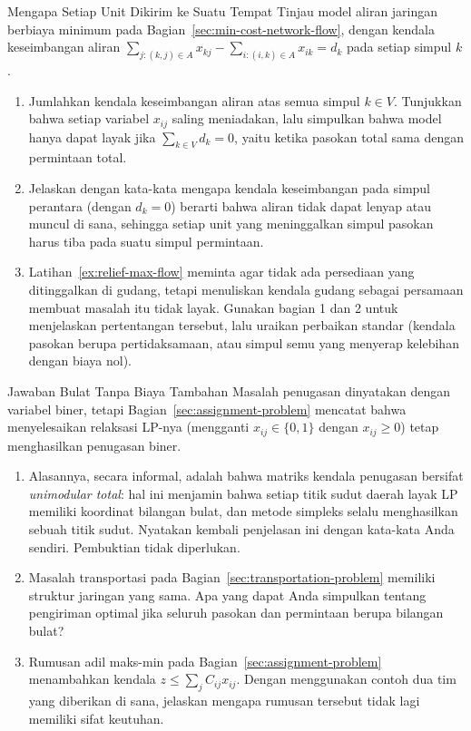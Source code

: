 
\begin{ex}{Mengapa Setiap Unit Dikirim ke Suatu Tempat}{}
\label{ex:flow-conservation-concept}
 Tinjau model aliran jaringan berbiaya minimum pada Bagian~\ref{sec:min-cost-network-flow}, dengan kendala keseimbangan aliran $\sum_{j : (k,j) \in A} x_{kj} - \sum_{i : (i,k) \in A} x_{ik} = d_k$ pada setiap simpul $k$.
\begin{enumerate}
\item Jumlahkan kendala keseimbangan aliran atas semua simpul $k \in V$. Tunjukkan bahwa setiap variabel $x_{ij}$ saling meniadakan, lalu simpulkan bahwa model hanya dapat layak jika $\sum_{k \in V} d_k = 0$, yaitu ketika pasokan total sama dengan permintaan total.
\item Jelaskan dengan kata-kata mengapa kendala keseimbangan pada simpul perantara (dengan $d_k = 0$) berarti bahwa aliran tidak dapat lenyap atau muncul di sana, sehingga setiap unit yang meninggalkan simpul pasokan harus tiba pada suatu simpul permintaan.
\item Latihan~\ref{ex:relief-max-flow} meminta agar tidak ada persediaan yang ditinggalkan di gudang, tetapi menuliskan kendala gudang sebagai persamaan membuat masalah itu tidak layak. Gunakan bagian 1 dan 2 untuk menjelaskan pertentangan tersebut, lalu uraikan perbaikan standar (kendala pasokan berupa pertidaksamaan, atau simpul semu yang menyerap kelebihan dengan biaya nol).
\end{enumerate}
\exrefs{\S\ref{sec:min-cost-network-flow}}
\end{ex}

\begin{ex}{Jawaban Bulat Tanpa Biaya Tambahan}{}
\label{ex:assignment-integrality-concept}
 Masalah penugasan dinyatakan dengan variabel biner, tetapi Bagian~\ref{sec:assignment-problem} mencatat bahwa menyelesaikan relaksasi LP-nya (mengganti $x_{ij} \in \{0,1\}$ dengan $x_{ij} \geq 0$) tetap menghasilkan penugasan biner.
\begin{enumerate}
\item Alasannya, secara informal, adalah bahwa matriks kendala penugasan bersifat \emph{unimodular total}: hal ini menjamin bahwa setiap titik sudut daerah layak LP memiliki koordinat bilangan bulat, dan metode simpleks selalu menghasilkan sebuah titik sudut. Nyatakan kembali penjelasan ini dengan kata-kata Anda sendiri. Pembuktian tidak diperlukan.
\item Masalah transportasi pada Bagian~\ref{sec:transportation-problem} memiliki struktur jaringan yang sama. Apa yang dapat Anda simpulkan tentang pengiriman optimal jika seluruh pasokan dan permintaan berupa bilangan bulat?
\item Rumusan adil maks-min pada Bagian~\ref{sec:assignment-problem} menambahkan kendala $z \leq \sum_j C_{ij} x_{ij}$. Dengan menggunakan contoh dua tim yang diberikan di sana, jelaskan mengapa rumusan tersebut tidak lagi memiliki sifat keutuhan.
\end{enumerate}
\exrefs{\S\ref{sec:assignment-problem}, \S\ref{sec:transportation-problem}}
\end{ex}

